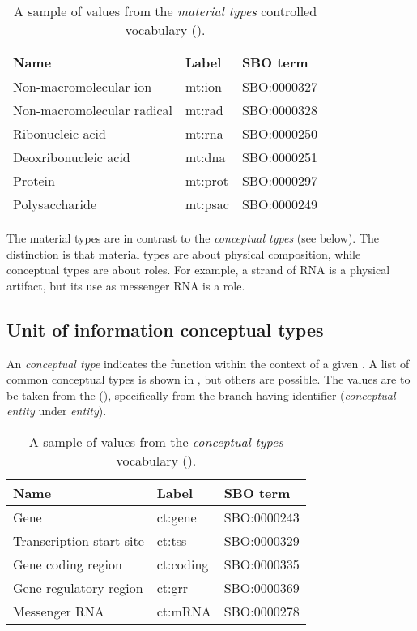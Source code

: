 \begin{table}[h]
  \centering
  \begin{tabular}{l>{\ttfamily}l>{\ttfamily}l}
    \toprule
    \textbf{Name}              & \textbf{\rmfamily Label} & \textbf{\rmfamily SBO term} \\
    \midrule
    Non-macromolecular ion     & mt:ion  & SBO:0000327\\
    Non-macromolecular radical & mt:rad  & SBO:0000328\\
    Ribonucleic acid           & mt:rna  & SBO:0000250\\
    Deoxribonucleic acid       & mt:dna  & SBO:0000251\\
    Protein                    & mt:prot & SBO:0000297\\
    Polysaccharide             & mt:psac & SBO:0000249\\
    \bottomrule
  \end{tabular}
  \caption{A sample of values from the \emph{material types} controlled
    vocabulary ().}
  \label{tab:af:material-types-cv}
\end{table}

The material types are in contrast to the \emph{conceptual types} (see below).  The distinction is that material types are about physical composition, while conceptual types are about roles.  For example, a strand of RNA is a physical artifact, but its use as messenger RNA is a role.

\subsection{Unit of information conceptual types}
\label{sec:af:conceptual-types-cv}

An  \emph{conceptual type} indicates the function within the context of a given \AF.  A list of common conceptual types is shown in , but others are possible.  The values are to be taken from the \sbo (\sbourl), specifically from the branch having identifier  ($\!$\emph{conceptual entity} under \emph{entity}). 

\begin{table}[h]
  \centering
  \begin{tabular}{l>{\ttfamily}l>{\ttfamily}l}
    \toprule
    \textbf{Name}              & \textbf{\rmfamily Label} & \textbf{\rmfamily SBO term} \\
    \midrule
    Gene                      & ct:gene   & SBO:0000243\\
    Transcription start site  & ct:tss    & SBO:0000329\\
    Gene coding region        & ct:coding & SBO:0000335\\
    Gene regulatory region    & ct:grr    & SBO:0000369\\
    Messenger RNA             & ct:mRNA   & SBO:0000278\\
    \bottomrule
  \end{tabular}
  \caption{A sample of values from the \emph{conceptual types} vocabulary
    ().}
  \label{tab:af:conceptual-types-cv}
\end{table}

